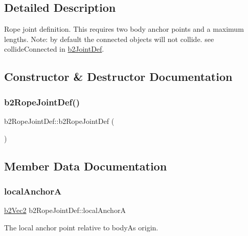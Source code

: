 \subsection{Detailed Description}
Rope joint definition. This requires two body anchor points and a maximum lengths. Note\+: by default the connected objects will not collide. see collide\+Connected in \mbox{\hyperlink{structb2_joint_def}{b2\+Joint\+Def}}. 

\subsection{Constructor \& Destructor Documentation}
\mbox{\label{structb2_rope_joint_def_abb2efd3b2edbd4df73dbbc32a2f01f92}} 
\subsubsection{\texorpdfstring{b2RopeJointDef()}{b2RopeJointDef()}}
{\footnotesize\ttfamily b2\+Rope\+Joint\+Def\+::b2\+Rope\+Joint\+Def (\begin{DoxyParamCaption}{ }\end{DoxyParamCaption})\hspace{0.3cm}{\ttfamily [inline]}}



\subsection{Member Data Documentation}
\mbox{\label{structb2_rope_joint_def_ab680fcc3cd44741a7a824ddff86ff01e}} 
\subsubsection{\texorpdfstring{localAnchorA}{localAnchorA}}
{\footnotesize\ttfamily \mbox{\hyperlink{structb2_vec2}{b2\+Vec2}} b2\+Rope\+Joint\+Def\+::local\+AnchorA}



The local anchor point relative to bodyA\textquotesingle{}s origin. 

\mbox{\label{structb2_rope_joint_def_a3271da0e4027e25546aa6a81e8fbe4e2}} 
